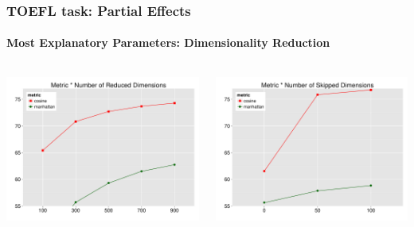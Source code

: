 \documentclass[t]{beamer} %
\begin{document}
\begin{frame}
  \frametitle{TOEFL task: Partial Effects}
  \framesubtitle{Most Explanatory Parameters: Dimensionality Reduction}
  \begin{columns}

    \begin{column}{0.5\textwidth}
      \centering
      \hspace*{-18pt}   \includegraphics[scale=0.30]{img/lapesa_toefl_main_metric_n-dim}

    \end{column}
    \begin{column}{0.5\textwidth}
      \hspace*{-18pt} 
      \includegraphics[scale=0.30]{img/lapesa_toefl_main_metric_dim-skip}
    \end{column}
  \end{columns}
  
\end{frame}
\end{document}
